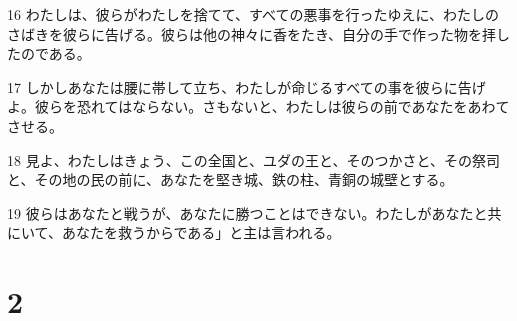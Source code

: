 \par 16 わたしは、彼らがわたしを捨てて、すべての悪事を行ったゆえに、わたしのさばきを彼らに告げる。彼らは他の神々に香をたき、自分の手で作った物を拝したのである。
\par 17 しかしあなたは腰に帯して立ち、わたしが命じるすべての事を彼らに告げよ。彼らを恐れてはならない。さもないと、わたしは彼らの前であなたをあわてさせる。
\par 18 見よ、わたしはきょう、この全国と、ユダの王と、そのつかさと、その祭司と、その地の民の前に、あなたを堅き城、鉄の柱、青銅の城壁とする。
\par 19 彼らはあなたと戦うが、あなたに勝つことはできない。わたしがあなたと共にいて、あなたを救うからである」と主は言われる。

\chapter{2}

